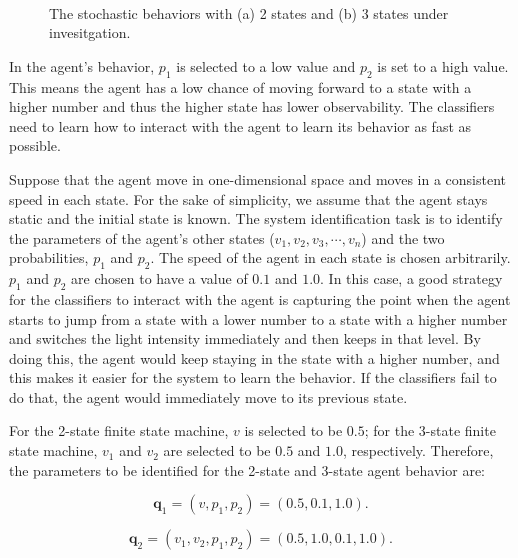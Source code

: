 \begin{figure}[!t]%
	\centering
		\\
		\caption{The stochastic behaviors with (a) 2 states and (b) 3 states under invesitgation.\label{fig:stochastic_interaction_case_study}}
\end{figure}

In the agent's behavior, $p_1$ is selected to a low value and $p_2$ is set to a high value. This means the agent has a low chance of moving forward to a state with a higher number and thus the higher state has lower observability. The classifiers need to learn how to interact with the agent to learn its behavior as fast as possible.

Suppose that the agent move in one-dimensional space and moves in a consistent speed in each state. For the sake of simplicity, we assume that the agent stays static and the initial state is known. The system identification task is to identify the parameters of the agent's other states ($v_1, v_2, v_3, \cdots, v_n$) and the two probabilities, $p_1$ and $p_2$. The speed of the agent in each state is chosen arbitrarily. $p_1$ and $p_2$ are chosen to have a value of $0.1$ and $1.0$. In this case, a good strategy for the classifiers to interact with the agent is capturing the point when the agent starts to jump from a state with a lower number to a state with a higher number and switches the light intensity immediately and then keeps in that level. By doing this, the agent would keep staying in the state with a higher number, and this makes it easier for the system to learn the behavior. If the classifiers fail to do that, the agent would immediately move to its previous state. 

For the 2-state finite state machine, $v$ is selected to be $0.5$; for the 3-state finite state machine, $v_1$ and $v_2$ are selected to be $0.5$ and $1.0$, respectively. Therefore, the parameters to be identified for the 2-state and 3-state agent behavior are:

\begin{equation}\label{eq:parameters_2_states}
\mathbf{q}_1 = (v, p_1, p_2) = (0.5, 0.1, 1.0).
\end{equation}

\begin{equation}\label{eq:parameters_3_states}
\mathbf{q}_2 = (v_1, v_2, p_1, p_2) = (0.5, 1.0, 0.1, 1.0).
\end{equation}

